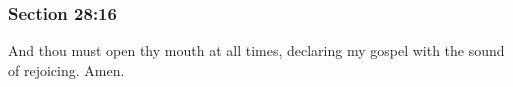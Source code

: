 	\subsubsection{Section 28:16} %
		\label{DC28-16}

		And thou must open thy mouth at all times, declaring my gospel with the sound of rejoicing.  Amen.

